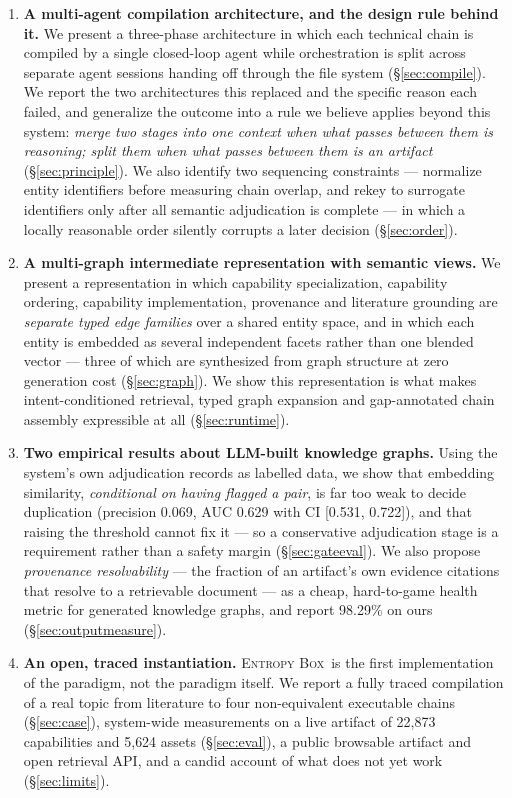 \documentclass[10pt,a4paper]{article}
\newcommand{\eb}{\textsc{Entropy Box}\xspace}
\begin{document}
\begin{enumerate}[leftmargin=1.6em,itemsep=4pt]
\item \textbf{A multi-agent compilation architecture, and the design rule behind
  it.} We present a three-phase architecture in which each technical chain is
  compiled by a single closed-loop agent while orchestration is split across
  separate agent sessions handing off through the file system
  (\S\ref{sec:compile}). We report the two architectures this replaced and the
  specific reason each failed, and generalize the outcome into a rule we believe
  applies beyond this system: \emph{merge two stages into one context when what
  passes between them is reasoning; split them when what passes between them is
  an artifact} (\S\ref{sec:principle}). We also identify two sequencing
  constraints --- normalize entity identifiers before measuring chain overlap,
  and rekey to surrogate identifiers only after all semantic adjudication is
  complete --- in which a locally reasonable order silently corrupts a later
  decision (\S\ref{sec:order}).

\item \textbf{A multi-graph intermediate representation with semantic views.} We
  present a representation in which capability specialization, capability
  ordering, capability implementation, provenance and literature grounding are
  \emph{separate typed edge families} over a shared entity space, and in which
  each entity is embedded as several independent facets rather than one blended
  vector --- three of which are synthesized from graph structure at zero
  generation cost (\S\ref{sec:graph}). We show this representation is what makes
  intent-conditioned retrieval, typed graph expansion and gap-annotated chain
  assembly expressible at all (\S\ref{sec:runtime}).

\item \textbf{Two empirical results about LLM-built knowledge graphs.} Using the
  system's own adjudication records as labelled data, we show that embedding
  similarity, \emph{conditional on having flagged a pair}, is far too weak to
  decide duplication (precision 0.069, AUC 0.629 with CI [0.531, 0.722]), and
  that raising the threshold cannot fix it --- so a conservative adjudication
  stage is a requirement rather than a safety margin (\S\ref{sec:gateeval}). We
  also propose \emph{provenance resolvability} --- the fraction of an artifact's
  own evidence citations that resolve to a retrievable document --- as a cheap,
  hard-to-game health metric for generated knowledge graphs, and report 98.29\%
  on ours (\S\ref{sec:outputmeasure}).

\item \textbf{An open, traced instantiation.} \eb\ is the first implementation of
  the paradigm, not the paradigm itself. We report a fully traced compilation of
  a real topic from literature to four non-equivalent executable chains
  (\S\ref{sec:case}), system-wide measurements on a live artifact of 22{,}873
  capabilities and 5{,}624 assets (\S\ref{sec:eval}), a public browsable artifact
  and open retrieval API, and a candid account of what does not yet work
  (\S\ref{sec:limits}).

\end{enumerate}
\end{document}
